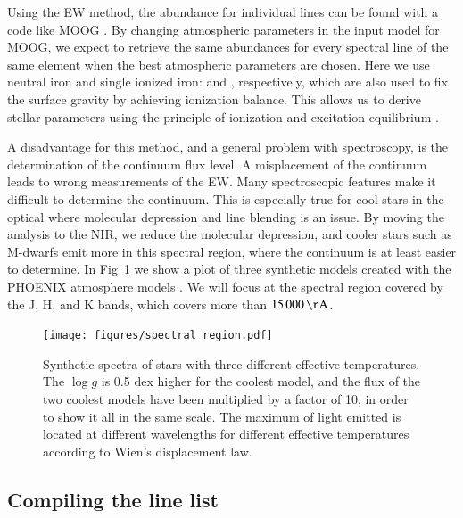 \documentclass{aa}
\begin{document}
Using the EW method, the abundance for individual lines can be found
with a code like MOOG \citep{Sneden1973}. By changing atmospheric
parameters in the input model for MOOG, we expect to retrieve the same
abundances for every spectral line of the same element when
the best atmospheric parameters are chosen. Here we use neutral iron and
single ionized iron:  and , respectively, which are also used to
fix the surface gravity by achieving ionization balance. This allows
us to derive stellar parameters using the principle of ionization and
excitation equilibrium \citep{Gray2006}.

A disadvantage for this method, and a general problem with spectroscopy,
is the determination of the continuum flux level. A misplacement of the
continuum leads to wrong measurements of the EW. Many spectroscopic
features make it difficult to determine the continuum. This is
especially true for cool stars in the optical where molecular depression
and line blending is an issue. By moving the analysis to the NIR, we
reduce the molecular depression, and cooler stars such as M-dwarfs
emit more in this spectral region, where the continuum is at least
easier to determine. In Fig~\ref{fig:spectral_region} we show a plot
of three synthetic models created with the PHOENIX atmosphere models
\citep{Husser2013}. We will focus at the spectral region covered by the
J, H, and K bands, which covers more than $\SI{15000}{\AA}$.

\begin{figure}[tbp!]
    \centering
    \texttt{[image: figures/spectral\_region.pdf]}
    \caption{Synthetic spectra of stars with three different effective
    temperatures. The $\log g$ is 0.5 dex higher for the coolest model,
    and the flux of the two coolest models have been multiplied by a
    factor of 10, in order to show it all in the same scale. The maximum
    of light emitted is located at different wavelengths for different
    effective temperatures according to Wien's displacement law.}
    \label{fig:spectral_region}
\end{figure}




\subsection{Compiling the line list}
\end{document}
